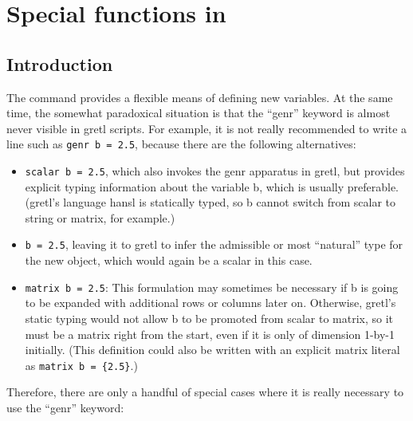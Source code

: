 \chapter{Special functions in }
\label{chap:genr}

\section{Introduction}
\label{genr-intro}

The  command provides a flexible means of defining new
variables. At the same time, the somewhat paradoxical situation is
that the ``genr'' keyword is almost never visible in gretl scripts. 
For example, it is not really recommended to write a line such as 
\texttt{genr b = 2.5}, because there are the following alternatives:

\begin{itemize}
\item \texttt{scalar b = 2.5}, which also invokes the genr apparatus 
  in gretl, but provides explicit typing information about the 
  variable b, which is usually preferable. (gretl's language hansl
  is statically typed, so b cannot switch from scalar to string or
  matrix, for example.)
  
\item \texttt{b = 2.5}, leaving it to gretl to infer the admissible 
or most ``natural'' type for the new object, which would again be a
scalar in this case. 

\item \texttt{matrix b = 2.5}: This formulation may sometimes be
necessary if b is going to be expanded with additional rows or 
columns later on. Otherwise, gretl's static typing would not allow
b to be promoted from scalar to matrix, so it must be a matrix right
from the start, even if it is only of dimension 1-by-1 initially. 
(This definition could also be written with an explicit matrix 
literal as \texttt{matrix b = \{2.5\}}.) 
\end{itemize}

Therefore, there are only a handful of special cases where it is 
really necessary to use the ``genr'' keyword:

